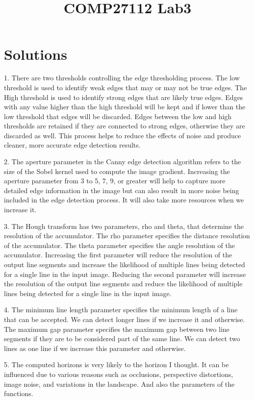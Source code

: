 \documentclass[a4]{article}
\title{COMP27112 Lab3}
\author{}
\begin{document}
\maketitle

\section{Solutions}
1. There are two thresholds controlling the edge thresholding process. The low threshold is used to identify weak edges that may or may not be true edges. The High threshold is used to identify strong edges that are likely true edges.
Edges with any value higher than the high threshold will be kept and if lower than the low threshold that edges will be discarded. Edges between the low and high thresholds are retained if they are connected to strong edges, otherwise they are discarded as well.
This process helps to reduce the effects of noise and produce cleaner, more accurate edge detection results.

2. The aperture parameter in the Canny edge detection algorithm refers to the size of the Sobel kernel used to compute the image gradient. Increasing the aperture parameter from 3 to 5, 7, 9, or greater will help to capture more detailed edge information in the image but can also result in more noise being included in the edge detection process. It will also take more resources when we increase it.

3. The Hough transform has two parameters, rho and theta, that determine the resolution of the accumulator.
The rho parameter specifies the distance resolution of the accumulator. The theta parameter specifies the angle resolution of the accumulator. Increasing the first parameter will reduce the resolution of the output line segments and increase the likelihood of multiple lines being detected for a single line in the input image. Reducing the second parameter will increase the resolution of the output line segments and reduce the likelihood of multiple lines being detected for a single line in the input image.

4. The minimum line length parameter specifies the minimum length of a line that can be accepted. We can detect longer lines if we increase it and otherwise.
The maximum gap parameter specifies the maximum gap between two line segments if they are to be considered part of the same line. We can detect two lines as one line if we increase this parameter and otherwise.

5. The computed horizons is very likely to the horizon I thought. It can be influenced due to various reasons such as occlusions, perspective distortions, image noise, and variations in the landscape. And also the parameters of the functions.

 


\appendix

\end{document}
